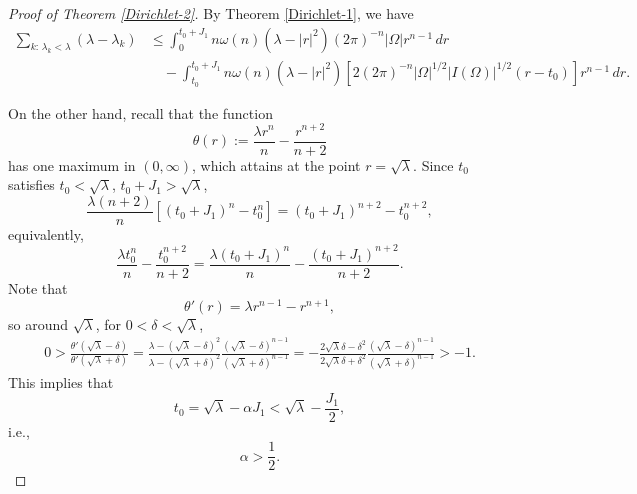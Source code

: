 \documentclass[11pt,twoside, leqno]{article}
\numberwithin{equation}{section}
\begin{document}
\begin{proof}[Proof of Theorem \ref{Dirichlet-2}]
By Theorem \ref{Dirichlet-1}, we have
\begin{align*}
\sum_{k:\,\lambda_k<\lambda}(\lambda-\lambda_k)&\le  \int_0^{t_0+J_1} n\omega(n)(\lambda-|r|^2)(2\pi)^{-n}|\Omega| r^{n-1} \,dr\nonumber\\
 &\quad-  \int_{t_0}^{t_0+J_1} n\omega(n)(\lambda-|r|^2)\left[2(2\pi)^{-n}|\Omega|^{1/2}|I(\Omega)|^{1/2}(r-t_0)\right] r^{n-1} \,dr.
\end{align*}

On the other hand,
recall that the function
$$\theta(r):=\frac{\lambda r^n}{n} -\frac{r^{n+2}}{n+2}$$
has  one maximum in $(0,\infty)$, which attains at the point
$r=\sqrt\lambda.$
Since $t_0$ satisfies $t_0<\sqrt\lambda$, $t_0+J_1>\sqrt\lambda$,
$$\frac{\lambda (n+2)}{n} [(t_0+J_1)^{n}-t_0^{n}] = (t_0+J_1)^{n+2}-t_0^{n+2},$$
equivalently,
$$\frac{\lambda t_0^n}{n} -\frac{t_0^{n+2}}{n+2}=\frac{\lambda (t_0+J_1)^n}{n} -\frac{(t_0+J_1)^{n+2}}{n+2}. $$
Note that
$$\theta'(r)=\lambda r^{n-1}-r^{n+1},$$
so around $\sqrt\lambda$, for $0<\delta<\sqrt\lambda$,
\begin{align*}
0>\frac{\theta'(\sqrt\lambda-\delta)}{\theta'(\sqrt\lambda+\delta)}=\frac{\lambda-(\sqrt\lambda-\delta)^2}{\lambda-(\sqrt\lambda+\delta)^2 }\frac{(\sqrt\lambda-\delta)^{n-1}}{(\sqrt\lambda+\delta)^{n-1}}=
-\frac{2\sqrt\lambda \delta-\delta^2}{2\sqrt\lambda \delta+\delta^2}\frac{(\sqrt\lambda-\delta)^{n-1}}{(\sqrt\lambda+\delta)^{n-1}}>-1.
\end{align*}
This implies that
$$t_0=\sqrt\lambda-\alpha J_1<\sqrt\lambda-\frac {J_1}{2},$$
i.e.,
$$\alpha>\frac 12.$$


\end{proof}
\end{document}
